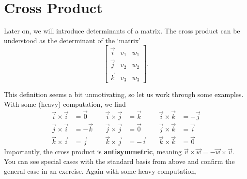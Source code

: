 \section{Cross Product}
\begin{remark}
	Later on, we will introduce determinants of a matrix. The cross product can be understood as the determinant of the `matrix'\[
	\begin{bmatrix}
		\vec{i} & v_1 & w_1 \\
		\vec{j} & v_2 & w_2 \\
		\vec{k} & v_3 & w_3
	\end{bmatrix}.
	\]
\end{remark}
This definition seems a bit unmotivating, so let us work through some examples.
With some (heavy) computation, we find
\begin{align*}
	\vec{i}\times\vec{i}&=\vec{0} \quad& \vec{i}\times\vec{j}&=\vec{k} \quad& \vec{i}\times\vec{k}&=-\vec{j} \\
	\vec{j}\times\vec{i}&=-\vec{k} \quad& \vec{j}\times\vec{j}&=\vec{0} \quad& \vec{j}\times\vec{k}&=\vec{i}\\
	\vec{k}\times\vec{i}&=\vec{j} \quad& \vec{k}\times\vec{j}&=-\vec{i} \quad& \vec{k}\times\vec{k}&=\vec{0}
\end{align*}
Importantly, the cross product is \textbf{antisymmetric}, meaning $\vec{v}\times\vec{w}=-\vec{w}\times\vec{v}$. You can see special cases with the standard basis from above and confirm the general case in an exercise.
Again with some heavy computation,
